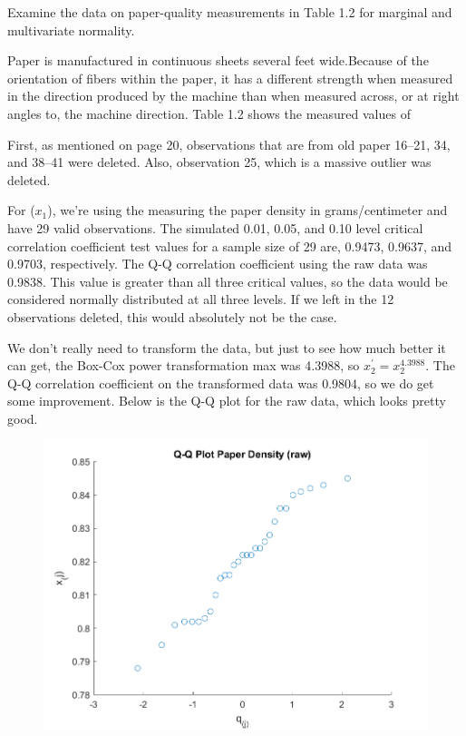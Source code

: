 Examine the data on paper-quality measurements in Table 1.2 for marginal and multivariate normality.


Paper is manufactured
in continuous sheets several feet wide.Because of the orientation of fibers
within the paper, it has a different strength when measured in the direction produced
by the machine than when measured across, or at right angles to, the machine
direction. Table 1.2 shows the measured values of

First, as mentioned on page 20, observations that are from old paper 16--21, 34, and 38--41 were deleted. Also, observation 25, which is a massive outlier was deleted.

For ($x_{1}$), we're using the measuring the paper density in grams/centimeter and have 29 valid observations. The simulated 0.01, 0.05, and 0.10 level critical correlation coefficient test values for a sample size of 29 are, 0.9473, 0.9637, and 0.9703, respectively. The Q-Q correlation coefficient using the raw data was 0.9838. This value is greater than all three critical values, so the data would be considered normally distributed at all three levels. If we left in the 12 observations deleted, this would absolutely not be the case.

We don't really need to transform the data, but just to see how much better it can get, the Box-Cox power transformation max was 4.3988, so $x_{2}^{\prime} = x_{2}^{4.3988}$. The Q-Q correlation coefficient on the transformed data was 0.9804, so we do get some improvement. Below is the Q-Q plot for the raw data, which looks pretty good.

\begin{center}
    \begin{figure}[H]
        \centering
        \includegraphics[scale=0.6]{./matlab/chapter-4/sol4.35.qq.1.png}
    \end{figure}
\end{center}

